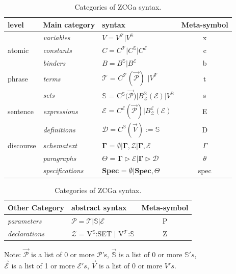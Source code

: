 \begin{table}[H]
\begin{tabular}{|l || l | l | c|}
\hline
level & Main category & syntax & Meta-symbol\\
\hline
& \textit{variables} & $V = V ^ {\mathcal{T}} \vert V ^ {\mathbb{S}}$ & x  \\
atomic & \textit{constants} & $C = C ^ {\mathcal{T}} \vert C ^ {\mathbb{S}}
\vert C ^ \mathcal{E}$ & c  \\
& \textit{binders} & $B = B ^ {\mathbb{S}} \vert B ^ \mathcal{E}$ & b \\
\hline
phrase & \textit{terms} & $\mathcal{T}$ =
$C^{\mathcal{T}}(\overrightarrow{\mathcal{P}})$  $\vert V ^ {\mathcal{T}}$ & t
\\
 & \textit{sets} & $\mathbb{S}$ =
 C$^{\mathbb{S}}(\overrightarrow{\mathcal{P}}$)$\vert
 B^{\mathbb{S}}_{\mathcal{Z}}(\mathcal{E}) \vert V^\mathbb{S}$ & s \\
\hline
sentence & \textit{expressions} & $\mathcal{E}$ =
$C^{\mathcal{E}}(\overrightarrow{\mathcal{P}}) \vert
B^{\mathcal{E}}_{\mathcal{Z}}(\mathcal{E})$ & E  \\
& \textit{definitions} & $\mathcal{D} = C^{\mathbb{S}}(\overrightarrow{V}):=
\mathbb{S}$ & D \\
\hline
discourse & \textit{schematext} & $\mathbf{\Gamma}$ = $\emptyset \vert
\mathbf{\Gamma}, \mathcal{Z} \vert \mathbf{\Gamma}, \mathcal{E}$ & $\Gamma$\\
& \textit{paragraphs} & $\Theta$ = $\mathbf{\Gamma} \triangleright \mathcal{E}
\vert \mathbf{\Gamma} \triangleright \mathcal{D}$ & $\theta$\\
& \textit{specifications} & \textbf{Spec} = $\emptyset \vert \mathbf{Spec},
\Theta$  & spec \\
\hline
\end{tabular}

\begin{tabular}{|l|l|c|}
\hline
Other Category & abstract syntax & Meta-symbol\\
\hline
\textit{parameters} & $\mathcal{P} = \mathcal{T} \vert \mathbb{S} \vert
\mathcal{E}$ & P\\
\textit{declarations} & $\mathcal{Z}$ = V$^{\mathbb{S}}$:SET $\vert$
V$^{\mathcal{T}}$:$\mathbb{S}$ & Z\\
\hline
\end{tabular}

Note: $\overrightarrow{\mathcal{P}}$ is a list of 0 or more $\mathcal{P}$'s,
$\overrightarrow{\mathbb{S}}$ is a list of 0 or more $\mathbb{S}'s$,\\
$\overrightarrow{\mathcal{E}}$ is a list of 1 or more $\mathcal{E}'s$,
$\overrightarrow{V}$ is a list of 0 or more $V's$.
\caption{Categories of ZCGa syntax.} \label{tab:zcga1}
\end{table}

